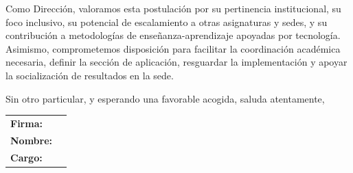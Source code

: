 \documentclass[10pt,letterpaper]{article}
\begin{document}
Como Dirección, valoramos esta postulación por su pertinencia institucional, su foco inclusivo, su potencial de escalamiento a otras asignaturas y sedes, y su contribución a metodologías de enseñanza-aprendizaje apoyadas por tecnología. Asimismo, comprometemos disposición para facilitar la coordinación académica necesaria, definir la sección de aplicación, resguardar la implementación y apoyar la socialización de resultados en la sede.

Sin otro particular, y esperando una favorable acogida, saluda atentamente,

\vfill

\begin{center}
\begin{tabular}{>{\bfseries}p{1.8cm}p{7.2cm}}
Firma: & \rule{0pt}{1.2cm}\hrulefill \\[0.15em]
Nombre: & \hrulefill \\[0.15em]
Cargo: & \hrulefill \\
\end{tabular}
\end{center}
\end{document}
